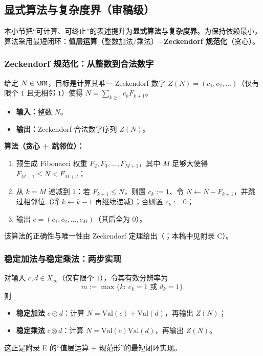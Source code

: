 \subsection{显式算法与复杂度界（审稿级）}\label{subsec:zeckendorf-algorithms-complexity}

本小节把“可计算、可终止”的表述提升为\textbf{显式算法}与\textbf{复杂度界}。为保持依赖最小，算法采用最短闭环：\textbf{值层运算}（整数加法/乘法）+\textbf{Zeckendorf 规范化}（贪心）。

\subsubsection{Zeckendorf 规范化：从整数到合法数字}

给定 $N\in\NN$，目标是计算其唯一 Zeckendorf 数字 $Z(N)=(c_1,c_2,\dots)$（仅有限个 $1$ 且无相邻 $1$）使得 $N=\sum_{k\ge 1}c_kF_{k+1}$。

\begin{itemize}
  \item \textbf{输入：}整数 $N$。
  \item \textbf{输出：}Zeckendorf 合法数字序列 $Z(N)$。
\end{itemize}

\textbf{算法（贪心 + 跳邻位）：}
\begin{enumerate}
  \item 预生成 Fibonacci 权重 $F_{2},F_{3},\dots,F_{M+1}$，其中 $M$ 足够大使得 $F_{M+1}\le N<F_{M+2}$；
  \item 从 $k=M$ 递减到 $1$：若 $F_{k+1}\le N$，则置 $c_k:=1$、令 $N\leftarrow N-F_{k+1}$，并跳过相邻位（将 $k\leftarrow k-1$ 再继续递减）；否则置 $c_k:=0$；
  \item 输出 $c=(c_1,c_2,\dots,c_M)$（其后全为 $0$）。
\end{enumerate}

该算法的正确性与唯一性由 Zeckendorf 定理给出（\cite{Zeckendorf1972}；本稿中见附录 C）。

\subsubsection{稳定加法与稳定乘法：两步实现}

对输入 $c,d\in X_\infty$（仅有限个 $1$），令其有效分辨率为
\[
m:=\max\{k:\ c_k=1\text{ 或 }d_k=1\}.
\]
则
\begin{itemize}
  \item \textbf{稳定加法} $c\oplus d$：计算 $N=\mathrm{Val}(c)+\mathrm{Val}(d)$，再输出 $Z(N)$；
  \item \textbf{稳定乘法} $c\otimes d$：计算 $N=\mathrm{Val}(c)\mathrm{Val}(d)$，再输出 $Z(N)$。
\end{itemize}
这正是附录 E 的“值层运算 + 规范形”的最短闭环实现。

